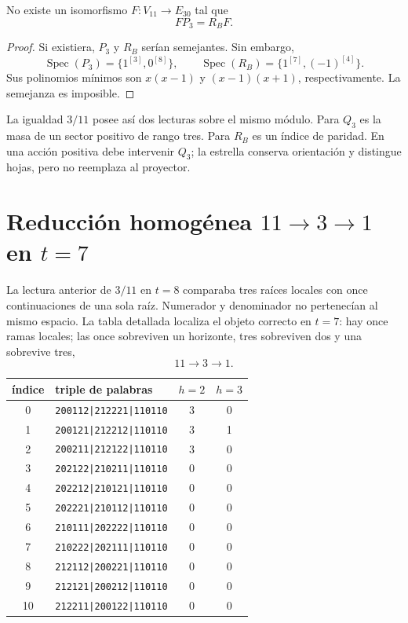 \begin{theorem}
\label{thm:no-go-proyector-estrella}
No existe un isomorfismo \(F:V_{11}\to E_{30}\) tal que
\[
 FP_3=R_BF.
\]
\end{theorem}

\begin{proof}
Si existiera, \(P_3\) y \(R_B\) serían semejantes. Sin embargo,
\[
 \operatorname{Spec}(P_3)=\{1^{[3]},0^{[8]}\},
 \qquad
 \operatorname{Spec}(R_B)=\{1^{[7]},(-1)^{[4]}\}.
\]
Sus polinomios mínimos son \(x(x-1)\) y
\((x-1)(x+1)\), respectivamente. La semejanza es imposible.
\end{proof}

La igualdad \(3/11\) posee así dos lecturas sobre el mismo módulo. Para
\(Q_3\) es la masa de un sector positivo de rango tres. Para \(R_B\) es
un índice de paridad. En una acción positiva debe intervenir \(Q_3\); la
estrella conserva orientación y distingue hojas, pero no reemplaza al
proyector.

\section{Reducción homogénea \texorpdfstring{\(11\to3\to1\)}{11-3-1} en \texorpdfstring{\(t=7\)}{t=7}}

La lectura anterior de \(3/11\) en \(t=8\) comparaba tres raíces locales
con once continuaciones de una sola raíz. Numerador y denominador no
pertenecían al mismo espacio. La tabla detallada localiza el objeto correcto
en \(t=7\): hay once ramas locales; las once sobreviven un horizonte, tres
sobreviven dos y una sobrevive tres,
\[
 \boxed{11\longrightarrow3\longrightarrow1.}
\]

\begin{center}
\small
\begin{tabularx}{\textwidth}{cYcc}
\toprule
índice&triple de palabras&\(h=2\)&\(h=3\)\\
&\texttt{200112|212221|110110}&3&0\\
1&\texttt{200121|212212|110110}&3&1\\
2&\texttt{200211|212122|110110}&3&0\\
3&\texttt{202122|210211|110110}&0&0\\
4&\texttt{202212|210121|110110}&0&0\\
5&\texttt{202221|210112|110110}&0&0\\
6&\texttt{210111|202222|110110}&0&0\\
7&\texttt{210222|202111|110110}&0&0\\
8&\texttt{212112|200221|110110}&0&0\\
9&\texttt{212121|200212|110110}&0&0\\
10&\texttt{212211|200122|110110}&0&0\\
\bottomrule
\end{tabularx}
\end{center}

